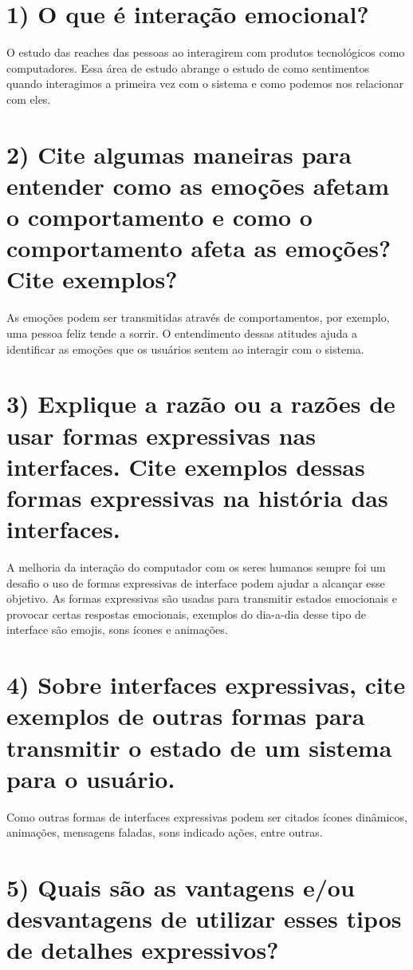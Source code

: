 \setcounter{secnumdepth}{0}
\section{1) O que é interação emocional?}

O estudo das reaches das pessoas ao interagirem com produtos tecnológicos
como computadores. Essa área de estudo abrange o estudo de como sentimentos
quando interagimos a primeira vez com o sistema e como podemos nos relacionar
com eles. 

\section{2) Cite algumas maneiras para entender como as emoções afetam o
comportamento e como o comportamento afeta as emoções? Cite exemplos?}

As emoções podem ser transmitidas através de comportamentos, por exemplo, uma
pessoa feliz tende a sorrir. O entendimento dessas atitudes ajuda a identificar
as emoções que os usuários sentem ao interagir com o sistema.

\section{3) Explique a razão ou a razões de usar formas expressivas nas 
interfaces. Cite exemplos dessas formas expressivas na história das interfaces.}

A melhoria da interação do computador com os seres humanos sempre foi um 
desafio o uso de formas expressivas de interface podem ajudar a alcançar 
esse objetivo. As formas expressivas são usadas para transmitir estados 
emocionais e provocar certas respostas emocionais, exemplos do dia-a-dia desse
tipo de interface são emojis, sons ícones e animações.

\section{4) Sobre interfaces expressivas, cite exemplos de outras formas para 
transmitir o estado de um sistema para o usuário.}

Como outras formas de interfaces expressivas podem ser citados ícones 
dinâmicos, animações, mensagens faladas, sons indicado ações, entre outras.

\section{5) Quais são as vantagens e/ou desvantagens de utilizar esses tipos 
de detalhes expressivos?}

